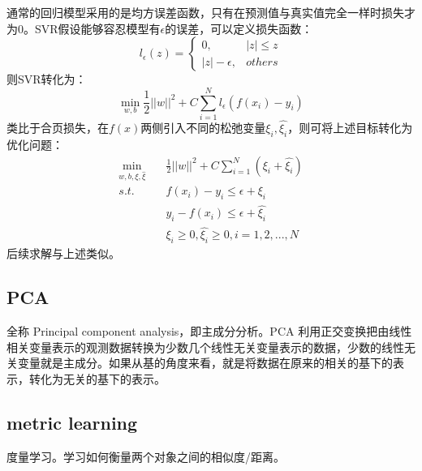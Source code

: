 通常的回归模型采用的是均方误差函数，只有在预测值与真实值完全一样时损失才为0。SVR假设能够容忍模型有$\epsilon$的误差，可以定义损失函数：
$$
l_\epsilon (z) = \begin{cases}0, &|z| \leq z \\ |z| - \epsilon, &others \end{cases}
$$
则SVR转化为：
$$
\mathop{min}_{w, b} \frac{1}{2} ||w||^2 + C \sum_{i=1}^N l_\epsilon (f(x_i) - y_i) 
$$
类比于合页损失，在$f(x)$两侧引入不同的松弛变量$\xi_i, \hat{\xi_i}$，则可将上述目标转化为优化问题：
\begin{align}
	\mathop{min}_{w, b, \xi, \hat{\xi}}\quad &\frac{1}{2} ||w||^2 + C \sum_{i=1}^{N} (\xi_i + \hat{\xi_i}) \nonumber \\
	s.t.\quad &f(x_i) - y_i \leq \epsilon + \xi_i \nonumber \\
			  &y_i - f(x_i) \leq \epsilon + \hat{\xi_i} \nonumber \\
			  &\xi_i \geq 0, \hat{\xi_i} \geq 0, i = 1, 2, ..., N \nonumber
\end{align}
后续求解与上述类似。


\subsection{PCA}
全称 Principal component analysis，即主成分分析。PCA 利用正交变换把由线性相关变量表示的观测数据转换为少数几个线性无关变量表示的数据，少数的线性无关变量就是主成分。如果从基的角度来看，就是将数据在原来的相关的基下的表示，转化为无关的基下的表示。


\subsection{metric learning} 
度量学习。学习如何衡量两个对象之间的相似度/距离。